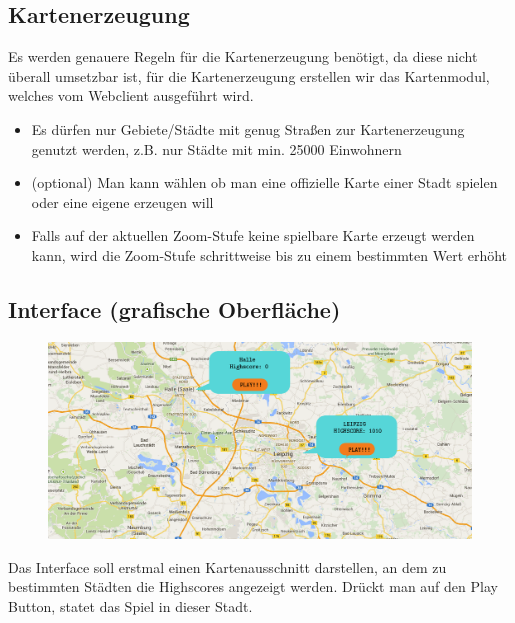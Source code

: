 \documentclass{article}
\begin{document}
\subsection{Kartenerzeugung}
Es werden genauere Regeln für die Kartenerzeugung benötigt, da diese nicht überall umsetzbar ist, für die Kartenerzeugung erstellen wir das Kartenmodul, welches vom Webclient ausgeführt wird.
\begin{itemize}
\item Es dürfen nur Gebiete/Städte mit genug Straßen zur Kartenerzeugung genutzt werden, z.B. nur Städte mit min. 25000 Einwohnern
\item (optional) Man kann wählen ob man eine offizielle Karte einer Stadt spielen oder eine eigene erzeugen will
\item Falls auf der aktuellen Zoom-Stufe keine spielbare Karte erzeugt werden kann, wird die Zoom-Stufe schrittweise bis zu einem bestimmten Wert erhöht
\end{itemize}

\subsection{Interface (grafische Oberfläche)} 
\begin{figure}[H]
  \centering
  \includegraphics[scale=0.3]{gui.png}
  \label{PNFs}
\end{figure} 
Das Interface soll erstmal einen Kartenausschnitt darstellen, an dem zu bestimmten Städten die Highscores angezeigt werden.
Drückt man auf den Play Button, statet das Spiel in dieser Stadt.
\end{document}
